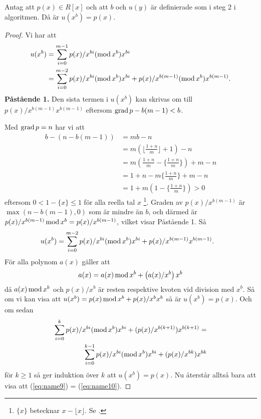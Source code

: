 \begin{lemma}
  \label{lemma:2}
  Antag att $p(x) \in R[x]$ och att $b$ och $u(y)$ är definierade som i steg 2 i
  algoritmen. Då är $u(x^b)=p(x)$.
\end{lemma}
\begin{proof}
  Vi har att
  \begin{align*}
    u(x^b) &= \sum_{i = 0}^{m-1} p(x)/x^{bi} (\operatorname*{mod} x^b) x^{bi} \\
           &= \sum_{i = 0}^{m-2} p(x)/x^{bi} (\operatorname*{mod} x^b) x^{bi} + p(x)/x^{b(m-1)} (\operatorname*{mod} x^b) x^{b (m-1)}.
  \end{align*}
  \bigskip\noindent
  \textbf{Påstående 1.} Den sista termen i $u(x^b)$ kan skrivas om till
  $p(x)/x^{b (m-1)} x^{b (m-1)}$ eftersom $\operatorname*{grad} p - b (m-1) < b$.

  Med $\operatorname*{grad} p = n$ har vi att
  \begin{align*}
    b - (n - b(m-1)) &= m b - n \\
                     &= m (\lfloor \frac{1 + n}{m}\rfloor + 1) - n \\
                     &= m( \frac{1 + n}{m} -\{ \frac{1 + n}{m}\} ) + m - n \\
                     &= 1 + n - m \{ \frac{1 + n}{m}\} + m - n \\
                     &= 1 + m(1 - \{ \frac{1 + n}{m}\}) > 0
  \end{align*}
  eftersom $0 < 1 - \{ x \} \leq 1$ för alla reella tal $x$ \footnote{$\{x\}$
  betecknar $x-\lfloor x \rfloor$. Se \cite{concrete}.}. Graden av
  $p(x)/x^{b(m-1)}$ är $\max (n - b(m-1),0)$ som är mindre än $b$, och därmed är
  $p(x)/x^{b(m-1)}  \operatorname*{mod} x^b = p(x)/x^{b(m-1)}$, vilket visar Påstående 1. Så
  \begin{align*}
    u(x^b) &= \sum_{i = 0}^{m-2} p(x)/x^{bi} (\operatorname*{mod} x^b) x^{bi} + p(x)/x^{b(m-1)} x^{b(m-1)}.
  \end{align*}
  För alla polynom $a(x)$ gäller att
  \begin{align}
    a(x) = a(x) \operatorname*{mod} x^b + \left(a(x)/x^b\right) x^b \label{eq:name8}
  \end{align}
  då $a(x) \operatorname*{mod} x^b$ och $p(x)/x^{b}$ är resten respektive kvoten vid division
  med $x^b$. Så om vi kan visa att $u(x^b) =  p(x) \operatorname*{mod} x^b + p(x)/x^{b}  x^{b}$
  så är $u(x^b) = p(x)$. Och om sedan
  \begin{align}
    \sum_{i = 0}^{k} p(x)/x^{bi}  (\operatorname*{mod} x^b) x^{bi} + (p(x)/x^{b(k + 1)})  x^{b(k + 1)} = \label{eq:name9} \\
    \sum_{i = 0}^{k-1} p(x)/x^{bi}  (\operatorname*{mod} x^b) x^{bi} + (p(x)/x^{b k})  x^{b k} \label{eq:name10}
  \end{align}
  för $k \geq 1$ så ger induktion över $k$ att $u(x^b) =  p(x)$. Nu återstår
  alltså bara att visa att (\ref{eq:name9}) = (\ref{eq:name10}).


\end{proof}
